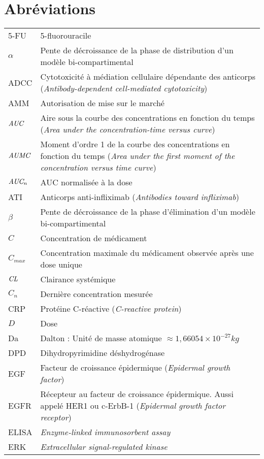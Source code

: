 \chapter*{Abréviations}
\begin{tabularx}{30em}{X X}
5-FU & 5-fluorouracile\\
$\alpha$ & 	Pente de décroissance de la phase de distribution d'un modèle bi-compartimental\\
ADCC & 	Cytotoxicité à médiation cellulaire dépendante des anticorps (\textit{Antibody-dependent cell-mediated cytotoxicity})\\
AMM & 	Autorisation de mise sur le marché\\
$\operatorname{\textit{AUC}}$ & 	Aire sous la courbe des concentrations en fonction du temps (\textit{Area under the concentration-time versus curve})\\
$\operatorname{\textit{AUMC}}$ & 	Moment d'ordre 1 de la courbe des concentrations en fonction du temps (\textit{Area under the first moment of the concentration versus time curve})\\
$\operatorname{\textit{AUC}}_n$ & 	AUC normalisée à la dose\\
ATI & 	Anticorps anti-infliximab (\textit{Antibodies toward infliximab})\\
$\beta$ & 	Pente de décroissance de la phase d'élimination d'un modèle bi-compartimental\\
$C$ & 	Concentration de médicament\\
$C_{max}$ & 	Concentration maximale du médicament observée après une dose unique\\
$\operatorname{\textit{CL}}$ & 	Clairance systémique\\
$C_n$ & 	Dernière concentration mesurée\\
CRP & 	Protéine C-réactive (\textit{C-reactive protein})\\
$D$ & 	Dose\\
Da & 	Dalton : Unité de masse atomique $\approx  1,66054\times 10^{-27} kg$\\
DPD & 	Dihydropyrimidine déshydrogénase\\
EGF & 	Facteur de croissance épidermique (\textit{Epidermal growth factor})\\
EGFR & 	Récepteur au facteur de croissance épidermique. Aussi appelé HER1 ou c-ErbB-1 (\textit{Epidermal growth factor receptor})\\
ELISA & 	\textit{Enzyme-linked immunosorbent assay}\\
ERK & 	\textit{Extracellular signal-regulated kinase}\\

\end{tabularx}
